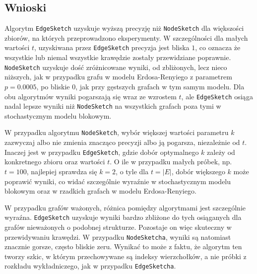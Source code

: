     \subsection{Wnioski}
    Algorytm \texttt{EdgeSketch} uzyskuje wyższą precyzję niż \texttt{NodeSketch} dla większości zbiorów, na których przeprowadzono eksperymenty. W szczególności dla małych wartości $t$, uzyskiwana przez \texttt{EdgeSketch} precyzja jest bliska $1$, co oznacza że wszystkie lub niemal wszystkie krawędzie zostały przewidziane poprawnie. \texttt{NodeSketch} uzyskuje dość zróżnicowane wyniki, od zbliżonych, lecz nieco niższych, jak w przypadku grafu w modelu Erdosa-Renyiego z parametrem $p = 0.0005$, po bliskie $0$, jak przy gęstszych grafach w tym samym modelu. Dla obu algorytmów wyniki pogarszają się wraz ze wzrostem $t$, ale \texttt{EdgeSketch} osiąga nadal lepsze wyniki niż \texttt{NodeSketch} na wszystkich grafach poza tymi w stochastycznym modelu blokowym. 
    
    W przypadku algorytmu \texttt{NodeSketch}, wybór większej wartości parametru $k$ zazwyczaj albo nie zmienia znacząco precyzji albo ją pogarsza, niezależnie od $t$. Inaczej jest w przypadku \texttt{EdgeSketch}, gdzie dobór optymalnego $k$ zależy od konkretnego zbioru oraz wartości $t$. O ile w przypadku małych próbek, np. $t = 100$, najlepiej sprawdza się $k = 2$, o tyle dla $t = |E|$, dobór większego $k$ może poprawić wyniki, co widać szczególnie wyraźnie w stochastycznym modelu blokowym oraz w rzadkich grafach w modelu Erdosa-Renyiego. 

    W przypadku grafów ważonych, różnica pomiędzy algorytmami jest szczególnie wyraźna. \texttt{EdgeSketch} uzyskuje wyniki bardzo zbliżone do tych osiąganych dla grafów nieważonych o podobnej strukturze. Pozostaje on więc skuteczny w przewidywaniu krawędzi. W przypadku \texttt{NodeSketcha}, wyniki są natomiast znacznie gorsze, często bliskie zeru. Wynikać to może z faktu, że algorytm ten tworzy szkic, w którym przechowywane są indeksy wierzchołków, a nie próbki z rozkładu wykładniczego, jak w przypadku \texttt{EdgeSketcha}.

